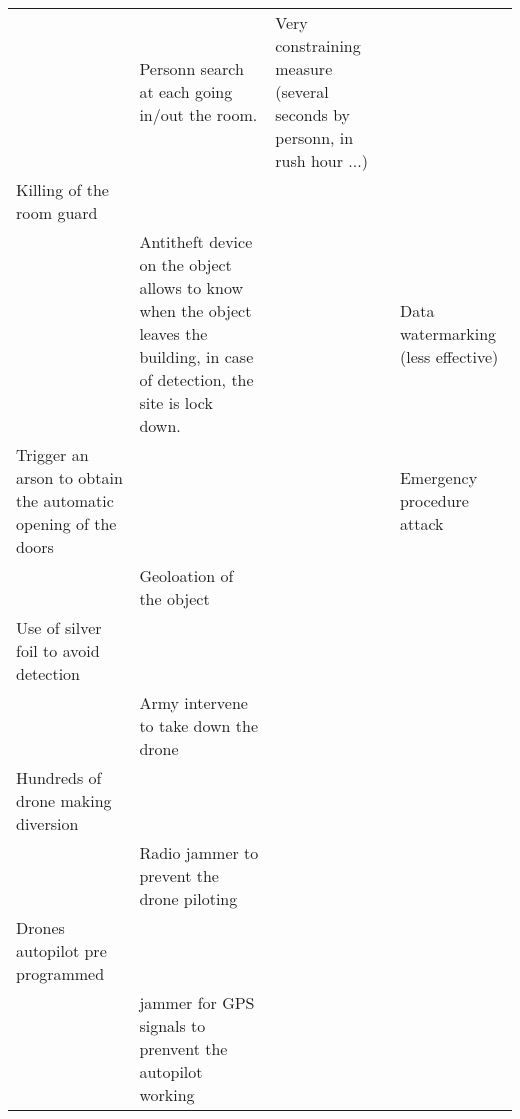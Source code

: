 \documentclass[11pt]{article} %
\begin{document}
\begin{longtable}{|p{3cm}|p{3cm}|p{3cm}|p{3cm}|}
& Personn search at each going in/out the room. & Very constraining measure
 (several seconds by personn, in rush hour ...) & \\
 Killing of the room guard & & & \\	 	 
& Antitheft device on the object allows to know when the object leaves the building, 
in case of detection, the site is lock down. & & Data watermarking (less effective) \\
Trigger an arson to obtain the automatic opening of the doors & & &
Emergency procedure attack \\
& Geoloation of the object & & \\
 Use of silver foil to avoid detection & & & \\
 & Army intervene to take down the drone & & \\
 Hundreds of drone making diversion & & & \\
& Radio jammer to prevent the drone piloting & & \\
 Drones autopilot pre programmed & & & \\	 
  & jammer for GPS signals to prenvent the autopilot working & & \\

\end{longtable}
\end{document}
